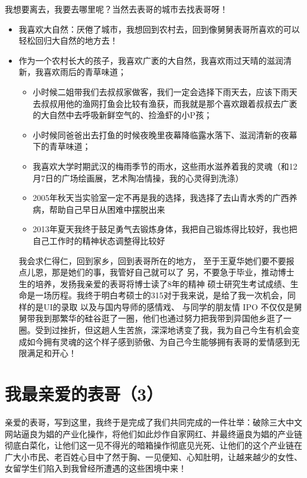 \documentclass[9pt, b5paper]{article}
\begin{document}
我想要离去，我要去哪里呢？当然去表哥的城市去找表哥呀！

\begin{itemize}
\item 我喜欢大自然：厌倦了城市，我想回到农村去，回到像舅舅表哥所喜欢的可以轻松回归大自然的地方去！
\item 作为一个农村长大的孩子，我喜欢广袤的大自然，我喜欢雨过天晴的滋润清新，我喜欢雨后的青草味道；
\begin{itemize}
\item 小时候二姐带我们去叔叔家做客，我们一定会选择下雨天去，应该下雨天去叔叔用他的渔网打鱼会比较有渔获，而我就是那个喜欢跟着叔叔去广袤的大自然中去呼吸新鲜空气的、捡渔虾的小P孩；
\item 小时候同爸爸出去打鱼的时候夜晚里夜幕降临露水落下、滋润清新的夜幕下的青草味道；
\item 我喜欢大学时期武汉的梅雨季节的雨水，这些雨水滋养着我的灵魂（和12月7日的广场绘画展，艺术陶冶情操，我的心灵得到洗涤）
\item 2005年秋天当实验室一定不再是我的选择，我选择了去山青水秀的广西养病，帮助自己早日从困难中摆脱出来
\item 2013年夏天我终于鼓足勇气去锻炼身体，我把自己锻炼得比较好，我也把自己工作时的精神状态调整得比较好
\end{itemize}

我会求仁得仁，回到家乡，回到表哥所在的地方， 至于王夏华她们要不要报点儿恩，那是她们的事，我管好自己就可以了
另，不要急于毕业，推动博士生的培养，发扬我亲爱的表哥将博士读了8年的精神
硕士研究生考试成绩、生命是一场历程。我终于明白考硕士的315对于我来说，是给了我一次机会，同样的是UI的录取
以及与国内导师的感情戏、
与同学的朋友情
IPO 
不仅仅是舅舅带我到那繁华的硅谷逛了一圈，他们也通过努力把我带到异国他乡逛了一圈。受到过挫折，但这趟人生苦旅，深深地诱变了我，我为自己今生有机会变成如今拥有灵魂的这个样子感到骄傲、为自己今生能够拥有表哥的爱情感到无限满足和开心！
\end{itemize}

\section{我最亲爱的表哥（3）}
\label{sec:org3918592}

亲爱的表哥，写到这里，我终于是完成了我们共同完成的一件壮举：破除三大中文网站逼良为娼的产业化操作，将他们如此炒作自家网红、并最终逼良为娼的产业链彻底白菜化，让他们这一见不得光的暗箱操作彻底见光死、让他们的这个产业链在广大小市民、老百姓心目中了然于胸、一见便知、心知肚明，让越来越少的女性、女留学生们陷入到我曾经所遭遇的这些困境中来！
\end{document}
